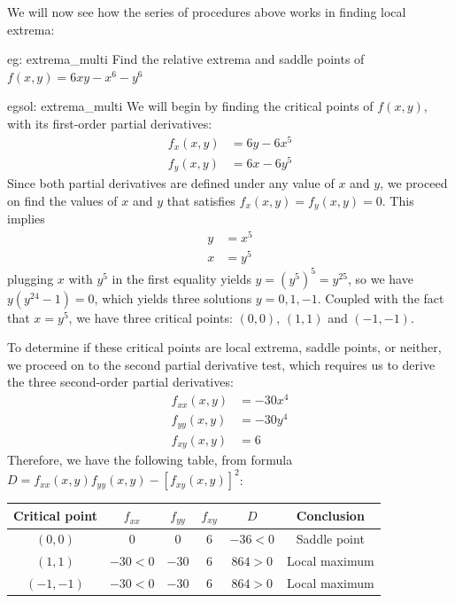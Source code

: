 We will now see how the series of procedures above works in finding local extrema:

\begin{eg}[]{eg: extrema_multi}
    Find the relative extrema and saddle points of $f(x,y) = 6xy - x^6 - y^6$
\end{eg}

\begin{egsol}[]{egsol: extrema_multi}
    We will begin by finding the critical points of $f(x,y)$, with its first-order partial derivatives:
    \begin{align*}
        f_x(x,y) &= 6y - 6x^5\\
        f_y(x,y) &= 6x - 6y^5
    \end{align*}
    Since both partial derivatives are defined under any value of $x$ and $y$, we proceed on find the values of $x$ and $y$ that satisfies $f_x(x,y) = f_y(x,y) = 0$.  This implies 
    \begin{align*}
        y &= x^5\\
        x &= y^5
    \end{align*}
    plugging $x$ with $y^5$ in the first equality yields $y = (y^5)^5 = y^{25}$, so we have $y(y^{24}-1) = 0$, which yields three solutions $y = 0, 1, -1$.  Coupled with the fact that $x=y^5$, we have three critical points: $(0,0)$, $(1,1)$ and $(-1,-1)$.  

    To determine if these critical points are local extrema, saddle points, or neither, we proceed on to the second partial derivative test, which requires us to derive the three second-order partial derivatives:
    \begin{align*}
        f_{xx}(x,y) &= - 30x^4\\
        f_{yy}(x,y) &= - 30y^4\\
        f_{xy}(x,y) &= 6
    \end{align*}
    Therefore, we have the following table, from formula $D = f_{xx}(x,y)f_{yy}(x,y)-[f_{xy}(x,y)]^2$:
    \begin{center}
        \begin{tabular}[ht]{cccccc}
            Critical point & $f_{xx}$ & $f_{yy}$ & $f_{xy}$ & $D$ & Conclusion\\
            \hline
            $(0,0)$ & $0$ & $0$ & $6$ & $-36<0$ & Saddle point\\
            $(1,1)$ & $-30<0$ & $-30$ & $6$ & $864>0$ & Local maximum\\
            $(-1,-1)$ & $-30<0$ & $-30$ & $6$ & $864>0$ & Local maximum
        \end{tabular}
    \end{center}
\end{egsol}

